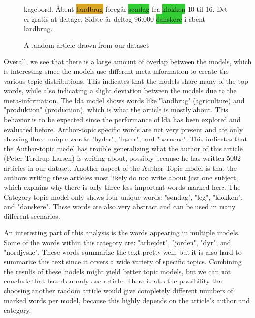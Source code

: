 \begin{figure}
\begin{tcolorbox}
{kagebord. Åbent \colorbox{Goldenrod}{landbrug} foregår \colorbox{LimeGreen}{søndag} fra \colorbox{LimeGreen}{klokken} 10 til 16. Det er gratis at deltage. Sidste år deltog 96.000 \colorbox{LimeGreen}{danskere} i åbent landbrug.
		}
	\end{tcolorbox}
	\caption{A random article drawn from our dataset}
	\label{fig:the_article}
\end{figure}

Overall, we see that there is a large amount of overlap between the models, which is interesting since the models use different meta-information to create the various topic distributions.
This indicates that the models share many of the top words, while also indicating a slight deviation between the models due to the meta-information.
The \gls{lda} model shows words like "landbrug" (agriculture) and "produktion" (production), which is what the article is mostly about.
This behavior is to be expected since the performance of \gls{lda} has been explored and evaluated before. 
Author-topic specific words are not very present and are only showing three unique words: "byder", "hører", and "børnene".
This indicates that the Author-topic model has trouble generalizing what the author of this article (Peter Tordrup Larsen) is writing about, possibly because he has written $5002$ articles in our dataset.
Another aspect of the Author-Topic model is that the authors writing these articles most likely do not write about just one subject, which explains why there is only three less important words marked here. 
The Category-topic model only shows four unique words: "søndag", "leg", "klokken", and "danskere".
These words are also very abstract and can be used in many different scenarios.

An interesting part of this analysis is the words appearing in multiple models.
Some of the words within this category are: "arbejdet", "jorden", "dyr", and "nordjyske".
These words summarize the text pretty well, but it is also hard to summarize this text since it covers a wide variety of specific topics.
Combining the results of these models might yield better topic models, but we can not conclude that based on only one article. 
There is also the possibility that choosing another random article would give completely different numbers of marked words per model, because this highly depends on the article's author and category.



